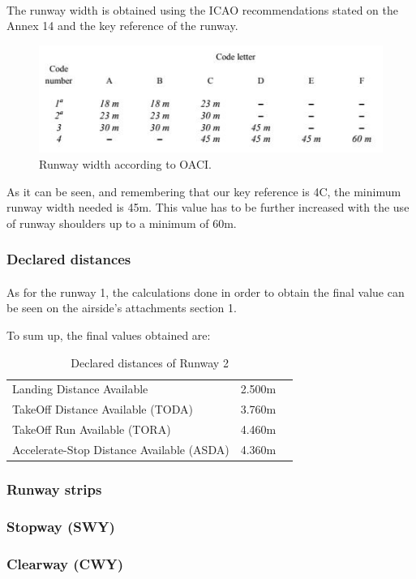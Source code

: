 		\paragraph{}The runway width is obtained using the ICAO recommendations stated on the Annex 14 and the key reference of the runway. 
	
		\begin{figure}[H]
			\centering
			\includegraphics[clip, trim=0cm 0cm 0cm 0cm, width=1\textwidth]{./images/Annex14/RunwayWidth}
			\caption{Runway width according to OACI.} %
			\label{} %
		\end{figure}
	
		As it can be seen, and remembering that our key reference is 4C, the minimum runway width needed is 45m. This value has to be further increased with the use of runway shoulders up to a minimum of 60m. 
	
		\subsubsection{Declared distances}
		\paragraph{} As for the runway 1, the calculations done in order to obtain the final value can be seen on the airside’s attachments section 1. 
	
	To sum up, the final values obtained are:
	
	\begin{table}[htb]
		\centering
		\begin{tabular}{ll p{5cm}}
			\midrule[1pt]
			Landing Distance Available & 2.500m\\
			TakeOff Distance Available (TODA) & 3.760m\\
			TakeOff Run Available (TORA)& 4.460m \\
			Accelerate-Stop Distance Available (ASDA)& 4.360m\\
			\bottomrule[2pt]
		\end{tabular}
		\caption{Declared distances of  Runway 2}
		\label{DeclareddistancesRW2}
	\end{table}
	
	
	\subsubsection{Runway strips}
	\subsubsection{Stopway (SWY)}
	\subsubsection{Clearway (CWY)}
	
	
		
		
		